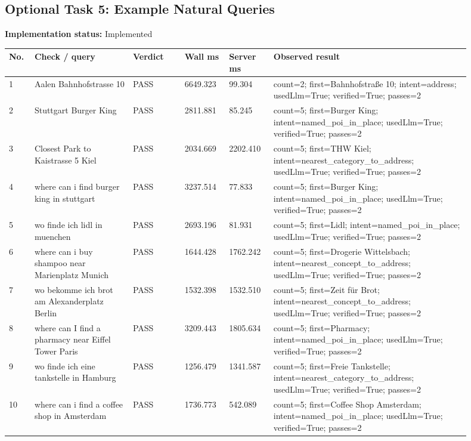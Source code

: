 \documentclass[10pt,a4paper]{article}
\begin{document}
\subsection{Optional Task 5: Example Natural Queries}
\textbf{Implementation status:} Implemented\\
\scriptsize
\begin{longtable}{|P{0.045\linewidth}|P{0.19\linewidth}|P{0.105\linewidth}|P{0.085\linewidth}|P{0.085\linewidth}|P{0.385\linewidth}|}
\hline
\textbf{No.} & \textbf{Check / query} & \textbf{Verdict} & \textbf{Wall ms} & \textbf{Server ms} & \textbf{Observed result}\\ \hline
{} 1 & Aalen Bahnhofstrasse 10 & PASS & 6649.323 & 99.304 & count=2; first=Bahnhofstraße 10; intent=address; usedLlm=True; verified=True; passes=2\\ \hline
{} 2 & Stuttgart Burger King & PASS & 2811.881 & 85.245 & count=5; first=Burger King; intent=named\_poi\_in\_place; usedLlm=True; verified=True; passes=2\\ \hline
{} 3 & Closest Park to Kaistrasse 5 Kiel & PASS & 2034.669 & 2202.410 & count=5; first=THW Kiel; intent=nearest\_category\_to\_address; usedLlm=True; verified=True; passes=2\\ \hline
{} 4 & where can i find burger king in stuttgart & PASS & 3237.514 & 77.833 & count=5; first=Burger King; intent=named\_poi\_in\_place; usedLlm=True; verified=True; passes=2\\ \hline
{} 5 & wo finde ich lidl in muenchen & PASS & 2693.196 & 81.931 & count=5; first=Lidl; intent=named\_poi\_in\_place; usedLlm=True; verified=True; passes=2\\ \hline
{} 6 & where can i buy shampoo near Marienplatz Munich & PASS & 1644.428 & 1762.242 & count=5; first=Drogerie Wittelsbach; intent=nearest\_concept\_to\_address; usedLlm=True; verified=True; passes=2\\ \hline
{} 7 & wo bekomme ich brot am Alexanderplatz Berlin & PASS & 1532.398 & 1532.510 & count=5; first=Zeit für Brot; intent=nearest\_concept\_to\_address; usedLlm=True; verified=True; passes=2\\ \hline
{} 8 & where can I find a pharmacy near Eiffel Tower Paris & PASS & 3209.443 & 1805.634 & count=5; first=Pharmacy; intent=named\_poi\_in\_place; usedLlm=True; verified=True; passes=2\\ \hline
{} 9 & wo finde ich eine tankstelle in Hamburg & PASS & 1256.479 & 1341.587 & count=5; first=Freie Tankstelle; intent=nearest\_category\_to\_address; usedLlm=True; verified=True; passes=2\\ \hline
{} 10 & where can i find a coffee shop in Amsterdam & PASS & 1736.773 & 542.089 & count=5; first=Coffee Shop Amsterdam; intent=named\_poi\_in\_place; usedLlm=True; verified=True; passes=2\\ \hline
\end{longtable}
\normalsize
\end{document}
